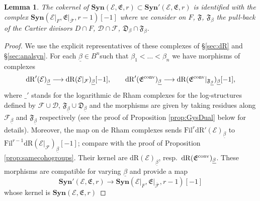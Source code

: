 \documentclass[asterisque,english]{smfart}
\newtheorem{lemma}[theo]{Lemma}
\begin{document}
\begin{lemma}\label{lemma:exactsyn} The cokernel of $\mathbf{Syn}(\mathcal{E},\mathfrak{E},r)\subset \mathbf{Syn}'(\mathcal{E},\mathfrak{E},r)$ is identified with the complex $\mathbf{Syn}(\mathcal{E}\vert_F,\mathfrak{E}\vert_{\mathcal{\overline{F}}},r-1)[-1]$ where we consider on $F$, $\mathfrak{F}$, $\mathfrak{F}_\beta$ the pull-back of the Cartier divisors $D\cap F$, $\mathcal{D}\cap \mathcal{F}$, $\mathfrak{D}_\beta\cap \mathfrak{F}_\beta$. 
\end{lemma}
\begin{proof}  We use the explicit representatives of these complexes of \S \ref{sec:dR}  and \S \ref{sec:analsyn}. For each $\underline{\beta} \in B^n$such that $\beta_1<\ldots < \beta_n$ we have morphisms of complexes
$$\mathrm{dR}'(\mathcal{E})_{\underline{\beta}} \longrightarrow \mathrm{dR}(\mathcal{E}\vert_{\mathcal{F}})_{\underline{\beta}}[-1], \qquad \mathrm{dR}'(\mathfrak{E}^{\rm conv})_{\underline{\beta}}\longrightarrow \mathrm{dR}(\mathfrak{E}^{\rm conv}\vert_{\mathfrak{F}_{\underline{\beta}}})_{\underline{\beta}}[-1],$$where $\_'$ stands for the logarithmic de Rham complexes for the log-structures defined by  $\mathcal{F}\cup \mathcal{D}$, $\mathfrak{F}_{\underline{\beta}}\cup \mathfrak{D}_{\underline{\beta}}$ and the morphisms are given by taking residues along $\mathcal{F}_{\underline{\beta}}$ and $\mathfrak{F}_{\underline{\beta}}$ respectively (see the proof of Proposition \ref{prop:GysDual} below for details). Moreover, the map on de Rham complexes sends $\mathrm{Fil}^r \mathrm{dR}'(\mathcal{E})_{\underline{\beta}}$ to $\mathrm{Fil}^{r-1}\mathrm{dR}(\mathcal{E}\vert_{\mathcal{F}})_{\underline{\beta}}[-1]$; compare with the proof of Proposition \ref{prop:samecohogroups}. Their kernel are $\mathrm{dR}(\mathcal{E})_{\underline{\beta}}$, resp.~$\mathrm{dR}(\mathfrak{E}^{\rm conv})_{\underline{\beta}}$. 
These morphisms are compatible for varying $\underline{\beta}$ and  provide a map $$\mathbf{Syn}'(\mathcal{E},\mathfrak{E},r)\longrightarrow \mathbf{Syn}(\mathcal{E}\vert_F,\mathfrak{E}\vert_{\mathcal{\overline{F}}},r-1)[-1]$$whose kernel is $\mathbf{Syn}(\mathcal{E},\mathfrak{E},r)$
\end{proof}
\end{document}
